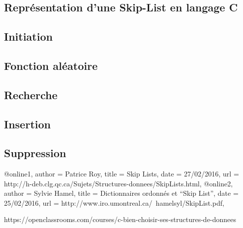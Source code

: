\documentclass[hidelinks,a4paper, 12pt]{article}
\begin{document}
	\newpage
	\begin{appendices}
	\section{Représentation d'une Skip-List en langage C}
	\subsection{Initiation}\label{SKInit}
	
	\subsection{Fonction aléatoire}\label{SKRandom}
	

	\subsection{Recherche}\label{SKSearch}
	

	\subsection{Insertion}\label{SKInsert}
	
	
	\subsection{Suppression}\label{SKDelete}
	
	\newpage
	\end{appendices}
	
	
	@online{1,
		author = {Patrice Roy},
		title = {Skip Lists},
		date = {27/02/2016},
		url = {http://h-deb.clg.qc.ca/Sujets/Structures-donnees/SkipLists.html},
	}
	@online{2,
		author = {Sylvie Hamel},
		title = {Dictionnaires ordonnés et “Skip List”},
		date = {25/02/2016},
		url = {http://www.iro.umontreal.ca/~hamelsyl/SkipList.pdf},
	}
	
	https://openclassrooms.com/courses/c-bien-choisir-ses-structures-de-donnees
	
\end{document}
